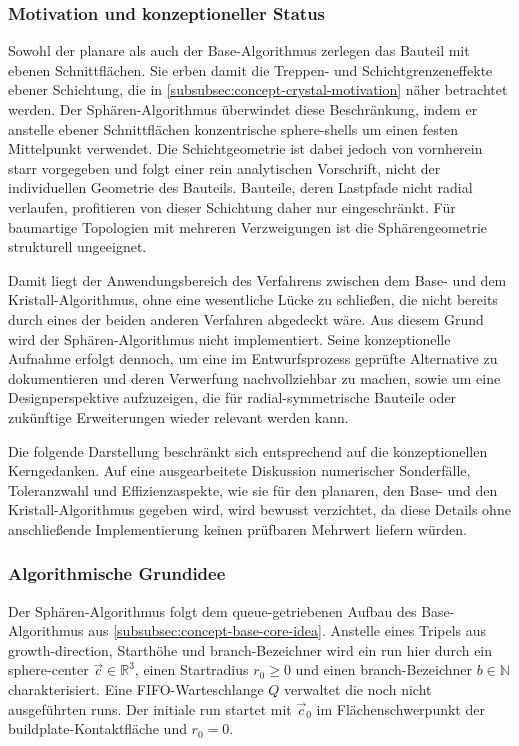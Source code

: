             \subsubsection{Motivation und konzeptioneller Status}\label{subsubsec:concept-sphere-motivation}
                Sowohl der planare als auch der Base-Algorithmus zerlegen das Bauteil mit ebenen Schnittflächen.
                Sie erben damit die Treppen- und Schichtgrenzeneffekte ebener Schichtung, die in \cref{subsubsec:concept-crystal-motivation} näher betrachtet werden.
                Der Sphären-Algorithmus überwindet diese Beschränkung, indem er anstelle ebener Schnittflächen konzentrische \glspl{sphere-shell} um einen festen Mittelpunkt verwendet.
                Die Schichtgeometrie ist dabei jedoch von vornherein starr vorgegeben und folgt einer rein analytischen Vorschrift, nicht der individuellen Geometrie des Bauteils.
                Bauteile, deren Lastpfade nicht radial verlaufen, profitieren von dieser Schichtung daher nur eingeschränkt.
                Für baumartige Topologien mit mehreren Verzweigungen ist die Sphärengeometrie strukturell ungeeignet.

                Damit liegt der Anwendungsbereich des Verfahrens zwischen dem Base- und dem Kristall-Algorithmus, ohne eine wesentliche Lücke zu schließen, die nicht bereits durch eines der beiden anderen Verfahren abgedeckt wäre.
                Aus diesem Grund wird der Sphären-Algorithmus nicht implementiert.
                Seine konzeptionelle Aufnahme erfolgt dennoch, um eine im Entwurfsprozess geprüfte Alternative zu dokumentieren und deren Verwerfung nachvollziehbar zu machen, sowie um eine Designperspektive aufzuzeigen, die für radial-symmetrische Bauteile oder zukünftige Erweiterungen wieder relevant werden kann.

                Die folgende Darstellung beschränkt sich entsprechend auf die konzeptionellen Kerngedanken.
                Auf eine ausgearbeitete Diskussion numerischer Sonderfälle, Toleranzwahl und Effizienzaspekte, wie sie für den planaren, den Base- und den Kristall-Algorithmus gegeben wird, wird bewusst verzichtet, da diese Details ohne anschließende Implementierung keinen prüfbaren Mehrwert liefern würden.

            \subsubsection{Algorithmische Grundidee}\label{subsubsec:concept-sphere-core-idea}
                Der Sphären-Algorithmus folgt dem queue-getriebenen Aufbau des Base-Algorithmus aus \cref{subsubsec:concept-base-core-idea}.
                Anstelle eines Tripels aus \gls{growth-direction}, Starthöhe und \gls{branch}-Bezeichner wird ein \gls{run} hier durch ein \gls{sphere-center} $\vec{c} \in \mathbb{R}^3$, einen Startradius $r_0 \geq 0$ und einen \gls{branch}-Bezeichner $b \in \mathbb{N}$ charakterisiert.
                Eine \ac{FIFO}-Warteschlange $Q$ verwaltet die noch nicht ausgeführten \glspl{run}.
                Der initiale \gls{run} startet mit $\vec{c}_0$ im Flächenschwerpunkt der \gls{buildplate}-Kontaktfläche und $r_0 = 0$.

